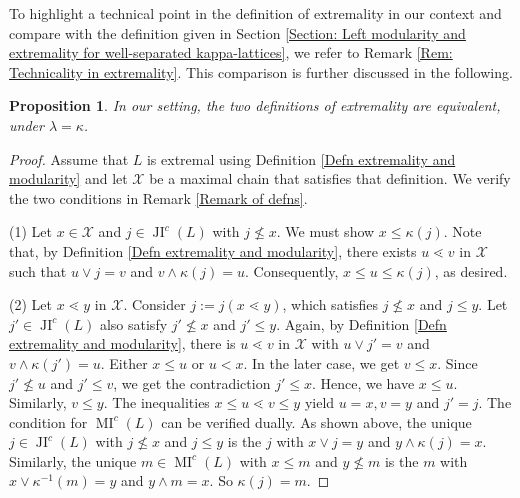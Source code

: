 \documentclass{amsart}
\theoremstyle{thmstyle}
\newtheorem{proposition}[thm]{Proposition}
\theoremstyle{exstyle}
\theoremstyle{defstyle}
\theoremstyle{remstyle}
\theoremstyle{remstyle}
\DeclareMathOperator*{\JI}{JI}
\DeclareMathOperator*{\MI}{MI}
\begin{document}
To highlight a technical point in the definition of extremality in our context and compare with the definition given in Section \ref{Section: Left modularity and extremality for well-separated kappa-lattices}, we refer to Remark \ref{Rem: Technicality in extremality}. This comparison is further discussed in the following.

\begin{proposition} \label{Prop: extremality equals left modularity}
    In our setting, the two definitions of extremality are equivalent, under $\lambda = \kappa$.
\end{proposition}

\begin{proof}
    Assume that $L$ is extremal using Definition \ref{Defn extremality and modularity} and let $\mathcal{X}$ be a maximal chain that satisfies that definition. We verify the two conditions in Remark \ref{Remark of defns}. 
    
    (1) Let $x \in \mathcal{X}$ and $j \in \JI^c(L)$ with $j \not\le x$. We must show $x \leq \kappa(j)$. 
    Note that, by Definition \ref{Defn extremality and modularity}, there exists $u \lessdot v$ in $\mathcal{X}$ such that $u \vee j = v$ and $v \wedge \kappa(j)=u$. Consequently, $x \le u \le \kappa(j)$, as desired.
    
    (2) Let $x \lessdot y$ in $\mathcal{X}$. Consider $j:=j(x \lessdot y)$, which satisfies $j \not\le x$ and $j \le y$. Let $j' \in \JI^c(L)$ also satisfy $j' \not\le x$ and $j' \le y$. 
    Again, by Definition \ref{Defn extremality and modularity}, there is $u \lessdot v$ in $\mathcal{X}$ with $u \vee j' = v$ and $v \wedge \kappa(j')=u$. Either $x \le u$ or $u < x$. In the later case, we get $v \le x$. Since  $j' \not \le u$ and $j' \le v$, we get the contradiction $j' \le x$. Hence, we have $x \le u$. Similarly, $v \le y$. The inequalities  $x \le u \lessdot v \le y$ yield $u=x, v=y$ and $j' = j$. 
    The condition for $\MI^c(L)$ can be verified dually. 
    As shown above, the unique $j\in \JI^c(L)$ with $j \not\le x$ and $j \le y$ is the $j$ with $x \vee j = y$ and $y \wedge \kappa(j) = x$. Similarly, the unique $m \in\MI^c(L)$ with $x \le m$ and $y \not\le m$ is the $m$ with $x \vee \kappa^{-1}(m) = y$ and $y \wedge m = x$. So $\kappa(j)=m$.


\end{proof}
\end{document}
